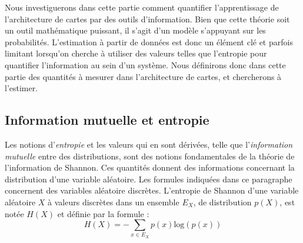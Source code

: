 
Nous investiguerons dans cette partie comment quantifier l'apprentissage de l'architecture de cartes par des outils d'information. Bien que cette théorie soit un outil mathématique puissant, il s'agit d'un modèle s'appuyant sur les probabilités. L'estimation à partir de données est donc un élément clé et parfois limitant lorsqu'on cherche à utiliser des valeurs telles que l'entropie pour quantifier l'information au sein d'un système. Nous définirons donc dans cette partie des quantités à mesurer dans l'architecture de cartes, et chercherons à l'estimer.

\subsection{Information mutuelle et entropie}

Les notions d'\emph{entropie} et les valeurs qui en sont dérivées, telle que l'\emph{information mutuelle} entre des distributions, sont des notions fondamentales de la théorie de l'information de Shannon. Ces quantités donnent des informations concernant la distribution d'une variable aléatoire.
Les formules indiquées dans ce paragraphe concernent des variables aléatoire discrètes. 
L'entropie de Shannon d'une variable aléatoire $X$ à valeurs discrètes dans un ensemble $E_X$, de distribution $p(X)$, est notée $H(X)$ et définie par la formule : 
\begin{equation}
H(X) = - \sum_{x \in E_X}{p(x)\textrm{log}(p(x))}
\end{equation}

